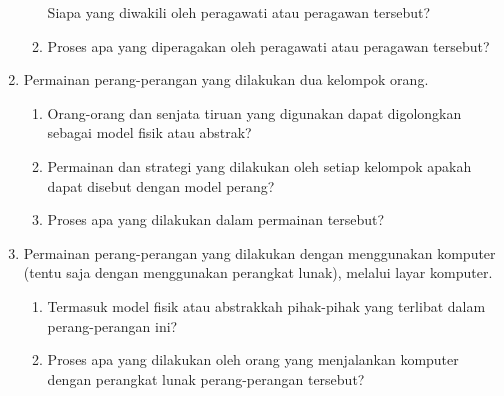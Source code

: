 \documentclass[10pt]{article}
\begin{document}
\begin{enumerate}
\begin{enumerate}
    Siapa yang diwakili oleh peragawati atau peragawan tersebut?
\item Proses apa yang diperagakan oleh peragawati atau peragawan
tersebut?
\end{enumerate}
\item Permainan perang-perangan yang dilakukan dua kelompok orang.
\begin{enumerate}
    \item Orang-orang dan senjata tiruan yang digunakan dapat digolongkan sebagai model fisik atau abstrak?
\item Permainan dan strategi yang dilakukan oleh setiap kelompok apakah dapat disebut dengan model perang?
\item Proses apa yang dilakukan dalam permainan tersebut?
\end{enumerate}
\item Permainan perang-perangan yang dilakukan dengan menggunakan komputer (tentu saja dengan menggunakan perangkat lunak), melalui layar komputer.
\begin{enumerate}
    \item Termasuk model fisik atau abstrakkah pihak-pihak yang terlibat dalam perang-perangan ini?
    \item  Proses apa yang dilakukan oleh orang yang menjalankan komputer dengan perangkat lunak perang-perangan tersebut?
\end{enumerate}
\end{enumerate}
\end{document}
